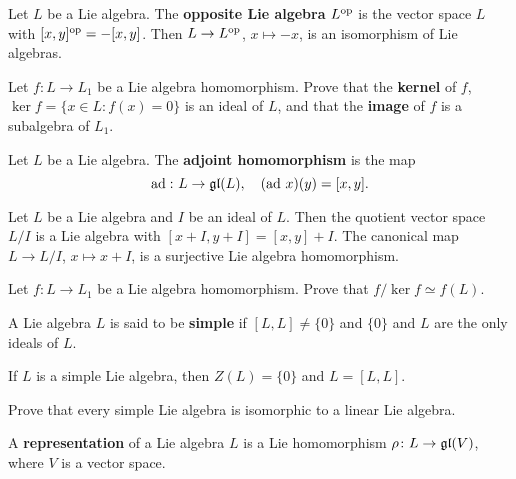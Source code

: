 \begin{example}
    Let $L$ be a Lie algebra. The \textbf{opposite Lie algebra} 
    $L^{\operatorname{op}}$ is the vector space $L$ with 
    $[x,y]^{\operatorname{op}}=-[x,y]$. Then $L\to L^{\operatorname{op}}$, $x\mapsto -x$, 
    is an isomorphism of Lie algebras.
\end{example}

\begin{exercise}
    Let $f\colon L\to L_1$ be a Lie algebra homomorphism. Prove
    that the \textbf{kernel} of $f$, 
    $\ker f=\{x\in L:f(x)=0\}$ is an ideal
    of $L$, and that the \textbf{image} of $f$ 
    is a subalgebra of $L_1$. 
\end{exercise}

\begin{example}
    Let $L$ be a Lie algebra. 
    The \textbf{adjoint homomorphism} is the map 
    \[
    \operatorname{ad}\,\colon L\to\mathfrak{gl}(L),\quad
    (\operatorname{ad}\,x)(y)=[x,y].
    \]
\end{example}

Let $L$ be a Lie algebra and $I$ be an ideal of $L$. Then 
the quotient vector space $L/I$ is a Lie algebra
with $[x+I,y+I]=[x,y]+I$. The canonical map 
$L\to L/I$, $x\mapsto x+I$, 
is a surjective Lie algebra homomorphism. 

\begin{exercise}
    Let $f\colon L\to L_1$ be a Lie algebra homomorphism.
    Prove that $f/\ker f\simeq f(L)$. 
\end{exercise}

\begin{definition}
    A Lie algebra $L$ is said to be \textbf{simple} if 
    $[L,L]\ne\{0\}$ and $\{0\}$ and $L$ are the only ideals of $L$. 
\end{definition}

If $L$ is a simple Lie algebra, then $Z(L)=\{0\}$ and $L=[L,L]$. 

\begin{exercise}
    Prove that every simple Lie algebra is isomorphic to 
    a linear Lie algebra. 
\end{exercise}


\begin{definition}
    A \textbf{representation} of a Lie algebra $L$ 
    is a Lie homomorphism $\rho\colon L\to\mathfrak{gl}(V)$, where $V$ is a vector space. 
\end{definition}

